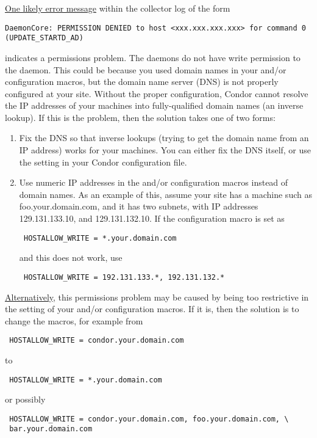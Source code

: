 \underline{One likely error message} within the collector log of the form
\begin{verbatim}
DaemonCore: PERMISSION DENIED to host <xxx.xxx.xxx.xxx> for command 0 (UPDATE_STARTD_AD)
\end{verbatim}
indicates a permissions problem.
The  daemons do not have write permission to the
 daemon.
This could be because
you used domain names in your  and/or
 configuration macros,
but the domain name server (DNS) is not properly configured at your site.
Without the proper configuration, Condor cannot resolve
the IP addresses of your machines
into fully-qualified domain names (an inverse lookup).
If this is the problem, then the solution takes one of two forms:
\begin{enumerate}
\item Fix the DNS so that inverse lookups (trying to get the domain name
   from an IP address) works for your machines.  You can
   either fix the DNS itself,
   or use the  setting in your Condor
         configuration file.
\item Use numeric IP addresses in the  and/or
    configuration macros
   instead of domain names.
   As an example of this, assume your site has a machine such as
   foo.your.domain.com, and it has two subnets, with IP addresses
   129.131.133.10, and 129.131.132.10.
   If the configuration macro is set as 

\begin{verbatim}
 HOSTALLOW_WRITE = *.your.domain.com
\end{verbatim}

   and this does not work, use

\begin{verbatim}
 HOSTALLOW_WRITE = 192.131.133.*, 192.131.132.*
\end{verbatim}
\end{enumerate}

\underline{Alternatively}, this permissions problem
may be caused by being too restrictive in the setting of
your  and/or
 configuration macros.
If it is, then the solution is to change the macros,
for example from
\begin{verbatim}
 HOSTALLOW_WRITE = condor.your.domain.com
\end{verbatim}
to
\begin{verbatim}
 HOSTALLOW_WRITE = *.your.domain.com
\end{verbatim}
or possibly
\begin{verbatim}
 HOSTALLOW_WRITE = condor.your.domain.com, foo.your.domain.com, \
 bar.your.domain.com 
\end{verbatim}


